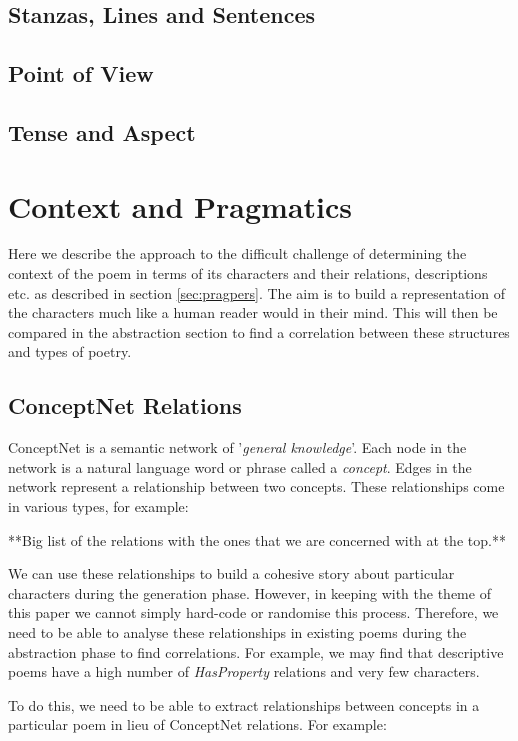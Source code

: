 \subsection{Stanzas, Lines and Sentences}

\subsection{Point of View}

\subsection{Tense and Aspect}



\section{Context and Pragmatics}
Here we describe the approach to the difficult challenge of determining the context of the poem in terms of its characters and their relations, descriptions etc. as described in section \ref{sec:pragpers}. The aim is to build a representation of the characters much like a human reader would in their mind. This will then be compared in the abstraction section to find a correlation between these structures and types of poetry.

\subsection{ConceptNet Relations}
ConceptNet is a semantic network of '\textit{general knowledge}'. Each node in the network is a natural language word or phrase called a \textit{concept}. Edges in the network represent a relationship between two concepts. These relationships come in various types, for example:

**Big list of the relations with the ones that we are concerned with at the top.**

We can use these relationships to build a cohesive story about particular characters during the generation phase. However, in keeping with the theme of this paper we cannot simply hard-code or randomise this process. Therefore, we need to be able to analyse these relationships in existing poems during the abstraction phase to find correlations. For example, we may find that descriptive poems have a high number of \textit{HasProperty} relations and very few characters.  

To do this, we need to be able to extract relationships between concepts in a particular poem in lieu of ConceptNet relations. For example:

